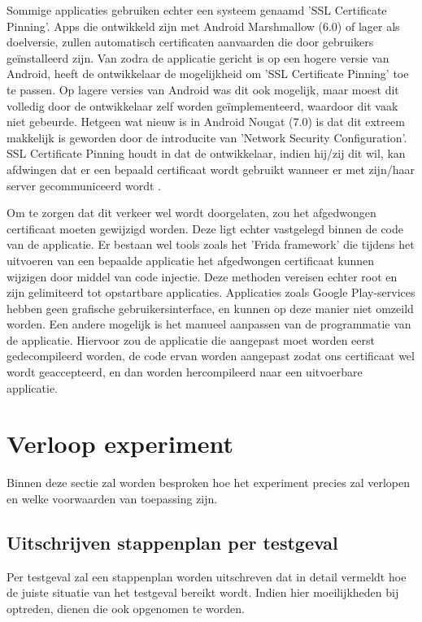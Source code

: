 Sommige applicaties gebruiken echter een systeem genaamd 'SSL Certificate Pinning'.  Apps die ontwikkeld zijn met Android Marshmallow (6.0) of lager als doelversie, zullen automatisch certificaten aanvaarden die door gebruikers geïnstalleerd zijn. Van zodra de applicatie gericht is op een hogere versie van Android, heeft de ontwikkelaar de mogelijkheid om 'SSL Certificate Pinning' toe te passen. Op lagere versies van Android was dit ook mogelijk, maar moest dit volledig door de ontwikkelaar zelf worden geïmplementeerd, waardoor dit vaak niet gebeurde. Hetgeen wat nieuw is in Android Nougat (7.0) is dat dit extreem makkelijk is geworden door de introducite van 'Network Security Configuration'. SSL Certificate Pinning houdt in dat de ontwikkelaar, indien hij/zij dit wil, kan afdwingen dat er een bepaald certificaat wordt gebruikt wanneer er met zijn/haar server gecommuniceerd wordt  \autocite{wass_ssl-pinning}.

Om te zorgen dat dit verkeer wel wordt doorgelaten, zou het  afgedwongen certificaat moeten gewijzigd worden. Deze ligt echter vastgelegd binnen de code van de applicatie. Er bestaan wel tools zoals het 'Frida framework' die tijdens het uitvoeren van een bepaalde applicatie het afgedwongen certificaat kunnen wijzigen door middel van code injectie. Deze methoden vereisen echter root en zijn gelimiteerd tot opstartbare applicaties. Applicaties zoals Google Play-services hebben geen grafische gebruikersinterface, en kunnen op deze manier niet omzeild worden. Een andere mogelijk is het manueel aanpassen van de programmatie van de applicatie. Hiervoor zou de applicatie die aangepast moet worden eerst gedecompileerd worden, de code ervan worden aangepast zodat ons certificaat wel wordt geaccepteerd, en dan worden hercompileerd naar een uitvoerbare applicatie. 

\section{Verloop experiment}
\label{sec:conditionsexperiment}
Binnen deze sectie zal worden besproken hoe het experiment precies zal verlopen en welke voorwaarden van toepassing zijn.

\subsection{Uitschrijven stappenplan per testgeval}
Per testgeval zal een stappenplan worden uitschreven dat in detail vermeldt hoe de juiste situatie van het testgeval bereikt wordt. Indien hier moeilijkheden bij optreden, dienen die ook opgenomen te worden.

